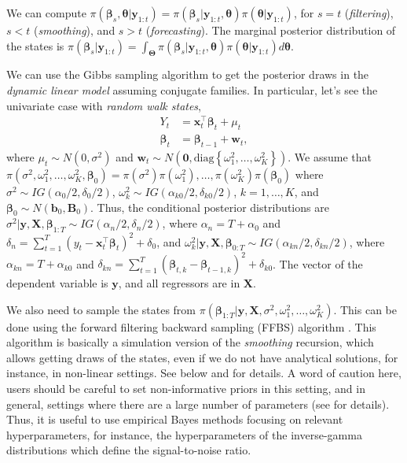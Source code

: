 We can compute $\pi(\bm{\beta}_s,\bm{\theta}|\bm{y}_{1:t})=\pi(\bm{\beta}_s|\bm{y}_{1:t},\bm{\theta})\pi(\bm{\theta}|\bm{y}_{1:t})$, for $s=t$ (\textit{filtering}), $s<t$ (\textit{smoothing}), and $s>t$ (\textit{forecasting}). The marginal posterior distribution of the states is $\pi(\bm{\beta}_s|\bm{y}_{1:t})=\int_{\bm{\Theta}}\pi(\bm{\beta}_s|\bm{y}_{1:t},\bm{\theta})\pi(\bm{\theta}|\bm{y}_{1:t})d\bm{\theta}$.

We can use the Gibbs sampling algorithm to get the posterior draws in the \textit{dynamic linear model} assuming conjugate families. In particular, let's see the univariate case with \textit{random walk states}, 
\begin{align}
	Y_t&=\bm{x}_t^{\top}\bm{\beta}_t+\mu_t\label{eq1Obs}\\
	\bm{\beta}_t&=\bm{\beta}_{t-1}+\bm{w}_t \label{eq1St},
\end{align}
where $\mu_t\sim N(0,\sigma^2)$ and $\bm{w}_t\sim N(\bm{0},\text{diag}\left\{\omega_1^2,\dots,\omega_K^2\right\})$. We assume that $\pi(\sigma^2,\omega_1^2,\dots,\omega_K^2,\bm{\beta}_0)=\pi(\sigma^2)\pi(\omega_1^2),\dots,\pi(\omega_K^2)\pi(\bm{\beta}_0)$ where $\sigma^2\sim IG(\alpha_0/2,\delta_0/2)$, $\omega_k^2\sim IG(\alpha_{k0}/2,\delta_{k0}/2)$, $k=1,\dots,K$, and $\bm{\beta}_0\sim N(\bm{b}_0,\bm{B}_0)$. Thus, the conditional posterior distributions are $\sigma^2|\bm{y},\bm{X},\bm{\beta}_{1:T}\sim IG(\alpha_{n}/2,\delta_n/2)$, where $\alpha_{n}=T+\alpha_0$ and $\delta_n=\sum_{t=1}^T(y_t-\bm{x}_t^{\top}\bm{\beta}_t)^2+\delta_0$, and $\omega_k^2|\bm{y},\bm{X},\bm{\beta}_{0:T}\sim IG(\alpha_{kn}/2,\delta_{kn}/2)$, where $\alpha_{kn}=T+\alpha_{k0}$ and $\delta_{kn}=\sum_{t=1}^T(\bm{\beta}_{t,k}-\bm{\beta}_{t-1,k})^2+\delta_{k0}$. The vector of the dependent variable is $\bm{y}$, and all regressors are in $\bm{X}$.

We also need to sample the states from $\pi(\bm{\beta}_{1:T}|\bm{y},\bm{X},\sigma^2,\omega_1^2,\dots,\omega_K^2)$. This can be done using the forward filtering backward sampling (FFBS) algorithm \cite{carter1994gibbs,fruhwirth1994data,shephard1994partial}. This algorithm is basically a simulation version of the \textit{smoothing} recursion, which allows getting draws of the states, even if we do not have analytical solutions, for instance, in non-linear settings. See below and \cite[Chap.~3]{petris2009dynamic} for details. A word of caution here, users should be careful to set non-informative priors in this setting, and in general, settings where there are a large number of parameters (see \cite[Chap.~8]{koop2003bayesian} for details). Thus, it is useful to use empirical Bayes methods focusing on relevant hyperparameters, for instance, the hyperparameters of the inverse-gamma distributions which define the signal-to-noise ratio.   

